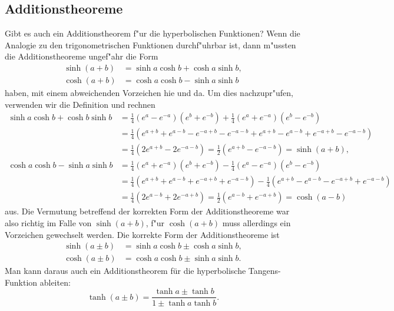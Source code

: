 \subsection{Additionstheoreme}
Gibt es auch ein Additionstheorem f"ur die hyperbolischen Funktionen?
Wenn die Analogie zu den trigonometrischen Funktionen durchf"uhrbar ist,
dann m"ussten die Additionstheoreme ungef"ahr die Form
\begin{equation}
\begin{aligned}
\sinh(a+b)&=\sinh a\cosh b + \cosh a\sinh b,\\
\cosh(a+b)&=\cosh a\cosh b - \sinh a\sinh b
\end{aligned}
\label{skript:sinh:additionstheorem:prelim}
\end{equation}
haben, mit einem abweichenden Vorzeichen hie und da.
Um dies nachzupr"ufen, verwenden wir die Definition und rechnen
\begin{align*}
\sinh a\cosh b + \cosh b\sinh b
&=
\frac14(e^a-e^{-a})(e^b+e^{-b})
+
\frac14(e^a+e^{-a})(e^b-e^{-b})
\\
&=\frac14(e^{a+b}+e^{a-b}-e^{-a+b}-e^{-a-b} + e^{a+b}-e^{a-b}+e^{-a+b}-e^{-a-b})
\\
&=
\frac14(2e^{a+b}-2e^{-a-b})
=
\frac12(e^{a+b}-e^{-a-b})=\sinh(a+b),
\\
\cosh a\cosh b-\sinh a\sinh b
&=
\frac14(e^a+e^{-a})(e^b+e^{-b})
-
\frac14(e^a-e^{-a})(e^b-e^{-b})
\\
&=
\frac14(e^{a+b}+e^{a-b}+e^{-a+b}+e^{-a-b})
-
\frac14(e^{a+b}-e^{a-b}-e^{-a+b}+e^{-a-b})
\\
&=
\frac14(2e^{a-b}+2e^{-a+b})
=
\frac12(e^{a-b}+e^{-a+b})=\cosh(a-b)
\end{align*}
aus.
Die Vermutung betreffend der korrekten Form der Additionstheoreme
war also richtig im Falle von $\sinh(a+b)$, f"ur $\cosh(a+b)$ muss
allerdings ein Vorzeichen gewechselt werden.
Die korrekte Form der Additionstheoreme ist
\begin{equation}
\begin{aligned}
\sinh(a\pm b)&=\sinh a\cosh b \pm \cosh a\sinh b,\\
\cosh(a\pm b)&=\cosh a\cosh b \pm \sinh a\sinh b.
\end{aligned}
\label{skript:sinh:additionstheorem}
\end{equation}
Man kann daraus auch ein Additionstheorem für die hyperbolische
Tangens-Funktion ableiten:
\begin{equation}
\tanh(a\pm b) = \frac{\tanh a \pm \tanh b}{1\pm\tanh a\tanh b}.
\label{skript:sinh:addtanh}
\end{equation}

